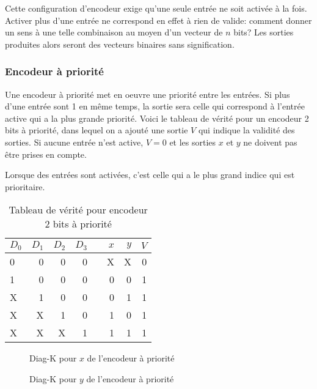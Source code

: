 \documentclass[11pt]{article}
\begin{document}
Cette configuration d'encodeur exige qu'une seule entrée ne soit
activée à la fois. Activer plus d'une entrée ne correspond en effet à
rien de valide: comment donner un sens à une telle combinaison au
moyen d'un vecteur de \(n\) bits? Les sorties produites alors seront
des vecteurs binaires sans signification.

\subsubsection{Encodeur à priorité}
\label{sec:orga106371}

Une encodeur à priorité met en oeuvre une priorité entre les
entrées. Si plus d'une entrée sont 1 en même temps, la sortie sera
celle qui correspond à l'entrée active qui a la plus grande
priorité. Voici le tableau de vérité pour un encodeur 2 bits à priorité,
dans lequel on a ajouté une sortie \(V\) qui indique la validité des
sorties. Si aucune entrée n'est active, \(V=0\) et les sorties \(x\)
et \(y\) ne doivent pas être prises en compte.

Lorsque des entrées sont activées, c'est celle qui a le plus grand
indice qui est prioritaire.

\begin{table}[htbp]
\caption{\label{tab:org50ca725}Tableau de vérité pour encodeur 2 bits à priorité}
\centering
\begin{tabular}{lrrrlrrr}
\(D_0\) & \(D_1\) & \(D_2\) & \(D_3\) &  & \(x\) & \(y\) & \(V\)\\
\hline
0 & 0 & 0 & 0 &  & X & X & 0\\
1 & 0 & 0 & 0 &  & 0 & 0 & 1\\
X & 1 & 0 & 0 &  & 0 & 1 & 1\\
X & X & 1 & 0 &  & 1 & 0 & 1\\
X & X & X & 1 &  & 1 & 1 & 1\\
\end{tabular}
\end{table}

\begin{figure}[htbp]
\centering

\caption{\label{fig:org1420ae3}Diag-K pour \(x\) de l'encodeur à priorité}
\end{figure}

\begin{figure}[htbp]
\centering

\caption{\label{fig:org2419613}Diag-K pour \(y\) de l'encodeur à priorité}
\end{figure}
\end{document}
